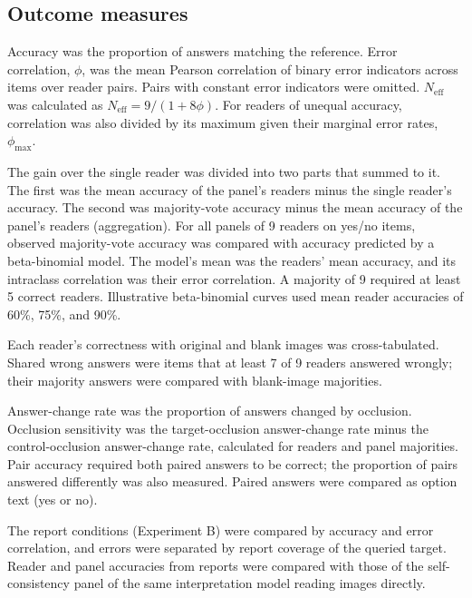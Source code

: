 \subsection{Outcome measures}
Accuracy was the proportion of answers matching the reference.
Error correlation, $\phi$, was the mean Pearson correlation of binary error indicators across items over reader pairs.
Pairs with constant error indicators were omitted.
$N_{\mathrm{eff}}$ was calculated as $N_{\mathrm{eff}}=9/(1+8\phi)$.\cite{kish1965survey}
For readers of unequal accuracy, correlation was also divided by its maximum given their marginal error rates, $\phi_{\max}$.

The gain over the single reader was divided into two parts that summed to it.
The first was the mean accuracy of the panel's readers minus the single reader's accuracy.
The second was majority-vote accuracy minus the mean accuracy of the panel's readers (aggregation).
For all panels of 9 readers on yes/no items, observed majority-vote accuracy was compared with accuracy predicted by a beta-binomial model.
The model's mean was the readers' mean accuracy, and its intraclass correlation was their error correlation.
A majority of 9 required at least 5 correct readers.
Illustrative beta-binomial curves used mean reader accuracies of 60\%, 75\%, and 90\%.

Each reader's correctness with original and blank images was cross-tabulated.
Shared wrong answers were items that at least 7 of 9 readers answered wrongly; their majority answers were compared with blank-image majorities.

Answer-change rate was the proportion of answers changed by occlusion.
Occlusion sensitivity was the target-occlusion answer-change rate minus the control-occlusion answer-change rate, calculated for readers and panel majorities.\cite{zeiler2014visualizing}
Pair accuracy required both paired answers to be correct; the proportion of pairs answered differently was also measured.
Paired answers were compared as option text (yes or no).

The report conditions (Experiment B) were compared by accuracy and error correlation, and errors were separated by report coverage of the queried target.
Reader and panel accuracies from reports were compared with those of the self-consistency panel of the same interpretation model reading images directly.

